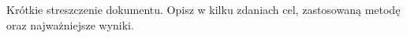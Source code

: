 Krótkie streszczenie dokumentu. Opisz w kilku zdaniach cel, zastosowaną metodę
oraz najważniejsze wyniki.
